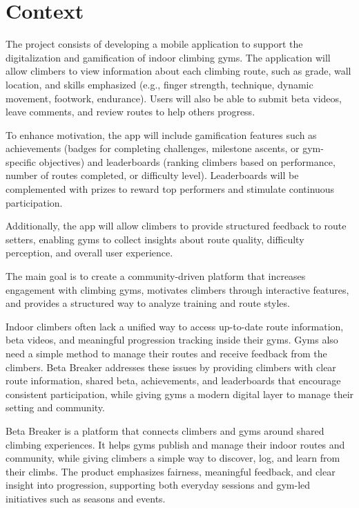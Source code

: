 \documentclass[12pt,a4paper]{report}
\renewcommand\_{\textunderscore\hspace{0pt}}
\begin{document}
\section{Context}

The project consists of developing a mobile application to support the digitalization and gamification of indoor climbing gyms. The application will allow climbers to view information about each climbing route, such as grade, wall location, and skills emphasized (e.g., finger strength, technique, dynamic movement, footwork, endurance). Users will also be able to submit beta videos, leave comments, and review routes to help others progress.

To enhance motivation, the app will include gamification \cite{DeDi11} features such as achievements (badges for completing challenges, milestone ascents, or gym-specific objectives) and leaderboards (ranking climbers based on performance, number of routes completed, or difficulty level). Leaderboards will be complemented with prizes to reward top performers and stimulate continuous participation.

Additionally, the app will allow climbers to provide structured feedback to route setters, enabling gyms to collect insights about route quality, difficulty perception, and overall user experience.

The main goal is to create a community-driven platform that increases engagement with climbing gyms, motivates climbers through interactive features, and provides a structured way to analyze training and route styles.

Indoor climbers often lack a unified way to access up-to-date route information, beta videos, and meaningful progression tracking inside their gyms. Gyms also need a simple method to manage their routes and receive feedback from the climbers. Beta Breaker addresses these issues by providing climbers with clear route information, shared beta, achievements, and leaderboards that encourage consistent participation, while giving gyms a modern digital layer to manage their setting and community.

Beta Breaker is a platform that connects climbers and gyms around shared climbing experiences. It helps gyms publish and manage their indoor routes and community, while giving climbers a simple way to discover, log, and learn from their climbs. The product emphasizes fairness, meaningful feedback, and clear insight into progression, supporting both everyday sessions and gym-led initiatives such as seasons and events.
\end{document}
